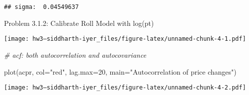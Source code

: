\documentclass[
]{article}
\newenvironment{Shaded}{\begin{snugshade}}{\end{snugshade}}
\newcommand{\AttributeTok}[1]{\textcolor[rgb]{0.77,0.63,0.00}{#1}}
\newcommand{\CommentTok}[1]{\textcolor[rgb]{0.56,0.35,0.01}{\textit{#1}}}
\newcommand{\ConstantTok}[1]{\textcolor[rgb]{0.00,0.00,0.00}{#1}}
\newcommand{\DecValTok}[1]{\textcolor[rgb]{0.00,0.00,0.81}{#1}}
\newcommand{\FunctionTok}[1]{\textcolor[rgb]{0.00,0.00,0.00}{#1}}
\newcommand{\NormalTok}[1]{#1}
\newcommand{\OtherTok}[1]{\textcolor[rgb]{0.56,0.35,0.01}{#1}}
\newcommand{\SpecialCharTok}[1]{\textcolor[rgb]{0.00,0.00,0.00}{#1}}
\newcommand{\StringTok}[1]{\textcolor[rgb]{0.31,0.60,0.02}{#1}}
\begin{document}
\begin{verbatim}
## sigma:  0.04549637
\end{verbatim}

Problem 3.1.2: Calibrate Roll Model with log(pt)

\begin{Shaded}
\end{Shaded}

\texttt{[image: hw3---siddharth-iyer\_files/figure-latex/unnamed-chunk-4-1.pdf]}

\begin{Shaded}
\begin{Highlighting}[]
\CommentTok{\# acf: both autocorrelation and autocovariance}

\FunctionTok{plot}\NormalTok{(acpr, }\AttributeTok{col=}\StringTok{"red"}\NormalTok{, }\AttributeTok{lag.max=}\DecValTok{20}\NormalTok{, }
     \AttributeTok{main=}\StringTok{"Autocorrelation of price changes"}\NormalTok{)}
\end{Highlighting}
\end{Shaded}

\texttt{[image: hw3---siddharth-iyer\_files/figure-latex/unnamed-chunk-4-2.pdf]}
\end{document}
